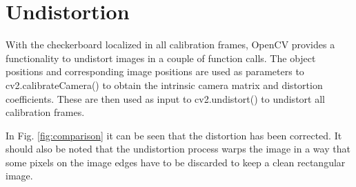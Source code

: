 \documentclass[bibliography=totoc]{scrartcl}
\begin{document}
\section{Undistortion}
With the checkerboard localized in all calibration frames, OpenCV provides a functionality to undistort images in a couple of function calls.
The object positions and corresponding image positions are used as parameters to cv2.calibrateCamera() to obtain the intrinsic camera matrix and distortion coefficients.
These are then used as input to cv2.undistort() to undistort all calibration frames.

In Fig. \ref{fig:comparison} it can be seen that the distortion has been corrected.
It should also be noted that the undistortion process warps the image in a way that some pixels on the image edges have to be discarded to keep a clean rectangular image.\\
\end{document}
